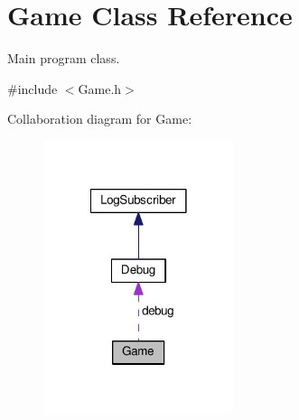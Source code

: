 \hypertarget{classGame}{\section{Game Class Reference}
\label{classGame}
}


Main program class.  




{\ttfamily \#include $<$Game.\-h$>$}



Collaboration diagram for Game\-:
\nopagebreak
\begin{figure}[H]
\begin{center}
\leavevmode
\includegraphics[width=158pt]{classGame__coll__graph}
\end{center}
\end{figure}
